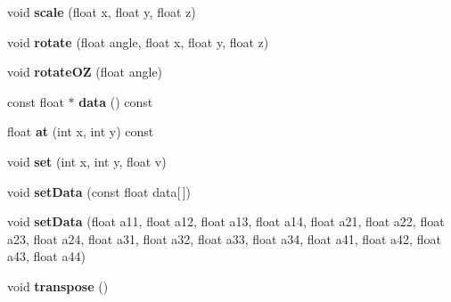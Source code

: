 \begin{DoxyCompactItemize}
\item 
\hypertarget{class_tempest_1_1_matrix4x4_a0dda6f6293aae82e24ac32ea812db213}{void {\bfseries scale} (float x, float y, float z)}\label{class_tempest_1_1_matrix4x4_a0dda6f6293aae82e24ac32ea812db213}

\item 
\hypertarget{class_tempest_1_1_matrix4x4_ae9afd7ac19cfac2869a6406c481992a5}{void {\bfseries rotate} (float angle, float x, float y, float z)}\label{class_tempest_1_1_matrix4x4_ae9afd7ac19cfac2869a6406c481992a5}

\item 
\hypertarget{class_tempest_1_1_matrix4x4_a5d58bff122541bc4d935bd672f6b898a}{void {\bfseries rotate\+O\+Z} (float angle)}\label{class_tempest_1_1_matrix4x4_a5d58bff122541bc4d935bd672f6b898a}

\item 
\hypertarget{class_tempest_1_1_matrix4x4_a7d625419536dfa05204f42b91623e6d6}{const float $\ast$ {\bfseries data} () const }\label{class_tempest_1_1_matrix4x4_a7d625419536dfa05204f42b91623e6d6}

\item 
\hypertarget{class_tempest_1_1_matrix4x4_a26e0dd83d6de55528d15c31b5d704ff5}{float {\bfseries at} (int x, int y) const }\label{class_tempest_1_1_matrix4x4_a26e0dd83d6de55528d15c31b5d704ff5}

\item 
\hypertarget{class_tempest_1_1_matrix4x4_a57c4397e087a02ec63b520be7cb40707}{void {\bfseries set} (int x, int y, float v)}\label{class_tempest_1_1_matrix4x4_a57c4397e087a02ec63b520be7cb40707}

\item 
\hypertarget{class_tempest_1_1_matrix4x4_a3aaa4a8b3bb56f1d79c03f3d70dafdae}{void {\bfseries set\+Data} (const float data\mbox{[}$\,$\mbox{]})}\label{class_tempest_1_1_matrix4x4_a3aaa4a8b3bb56f1d79c03f3d70dafdae}

\item 
\hypertarget{class_tempest_1_1_matrix4x4_abd0edc543e846d1c28cdb21fb33d5614}{void {\bfseries set\+Data} (float a11, float a12, float a13, float a14, float a21, float a22, float a23, float a24, float a31, float a32, float a33, float a34, float a41, float a42, float a43, float a44)}\label{class_tempest_1_1_matrix4x4_abd0edc543e846d1c28cdb21fb33d5614}

\item 
\hypertarget{class_tempest_1_1_matrix4x4_a55f523640978f75f7f77581c50a9ee1f}{void {\bfseries transpose} ()}\label{class_tempest_1_1_matrix4x4_a55f523640978f75f7f77581c50a9ee1f}


\end{DoxyCompactItemize}

